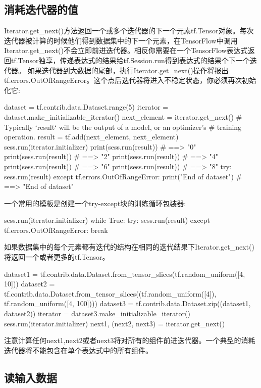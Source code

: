 \subsection{消耗迭代器的值}
Iterator.get\_next()方法返回一个或多个迭代器的下一个元素tf.Tensor对象。每次迭代器被计算的时候他们得到数据集中的下一个元素，在TensorFlow中调用Iterator.get\_next()不会立即前进迭代器。相反你需要在一个TensorFlow表达式返回tf.Tensor独享，传递表达式的结果给tf.Session.run得到表达式的结果个下一个迭代器。
如果迭代器到大数据的尾部，执行Iterator.get\_next()操作将报出tf.errors.OutOfRangeError。这个点后迭代器将进入不稳定状态，你必须再次初始化它:
\begin{python}
dataset = tf.contrib.data.Dataset.range(5)
iterator = dataset.make_initializable_iterator()
next_element = iterator.get_next()
# Typically `result` will be the output of a model, or an optimizer's
# training operation.
result = tf.add(next_element, next_element)
sess.run(iterator.initializer)
print(sess.run(result))  # ==> "0"
print(sess.run(result))  # ==> "2"
print(sess.run(result))  # ==> "4"
print(sess.run(result))  # ==> "6"
print(sess.run(result))  # ==> "8"
try:
    sess.run(result)
except tf.errors.OutOfRangeError:
    print("End of dataset")  # ==> "End of dataset"
\end{python}
一个常用的模板是创建一个try-except块的训练循环包装器:
\begin{python}
sess.run(iterator.initializer)
while True:
    try:
        sess.run(result)
    except tf.errors.OutOfRangeError:
        break
\end{python}
如果数据集中的每个元素都有迭代的结构在相同的迭代结果下Iterator.get\_next()将返回一个或者更多的tf.Tensor。
\begin{python}
dataset1 = tf.contrib.data.Dataset.from_tensor_slices(tf.random_uniform([4, 10]))
dataset2 = tf.contrib.data.Dataset.from_tensor_slices((tf.random_uniform([4]), tf.random_uniform([4, 100])))
dataset3 = tf.contrib.data.Dataset.zip((dataset1, dataset2))
iterator = dataset3.make_initializable_iterator()
sess.run(iterator.initializer)
next1, (next2, next3) = iterator.get_next()
\end{python}
注意计算任何next1,next2或者next3将对所有的组件前进迭代器。一个典型的消耗迭代器将不能包含在单个表达式中的所有组件。
\subsection{读输入数据}
